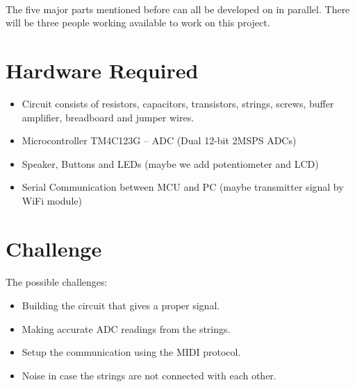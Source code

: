 \documentclass{article}
\begin{document}
\paragraph{}The five major parts mentioned before can all be developed on in parallel. There will be three people working available to work on this project.

\section{Hardware Required}
\begin{itemize}
    \item Circuit consists of resistors, capacitors, transistors, strings, screws, buffer amplifier, breadboard and jumper wires.  
    \item Microcontroller TM4C123G – ADC (Dual 12-bit 2MSPS ADCs)
    \item Speaker, Buttons and LEDs (maybe we add potentiometer and LCD)
    \item Serial Communication between MCU and PC (maybe transmitter signal by WiFi module)
\end{itemize}


\section{Challenge}

\paragraph{}The possible challenges:
\begin{itemize}
    \item Building the circuit that gives a proper signal.
    \item Making accurate ADC readings from the strings.
    \item Setup the communication using the MIDI protocol.
    \item Noise in case the strings are not connected with each other.
\end{itemize}
\end{document}
